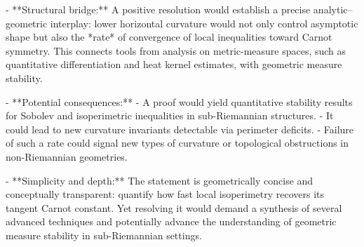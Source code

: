 - **Structural bridge:** A positive resolution would establish a precise analytic–geometric interplay: lower horizontal curvature would not only control asymptotic shape but also the *rate* of convergence of local inequalities toward Carnot symmetry. This connects tools from analysis on metric-measure spaces, such as quantitative differentiation and heat kernel estimates, with geometric measure stability.  

- **Potential consequences:**  
  - A proof would yield quantitative stability results for Sobolev and isoperimetric inequalities in sub-Riemannian structures.  
  - It could lead to new curvature invariants detectable via perimeter deficits.  
  - Failure of such a rate could signal new types of curvature or topological obstructions in non-Riemannian geometries.  

- **Simplicity and depth:** The statement is geometrically concise and conceptually transparent: quantify how fast local isoperimetry recovers its tangent Carnot constant. Yet resolving it would demand a synthesis of several advanced techniques and potentially advance the understanding of geometric measure stability in sub-Riemannian settings.